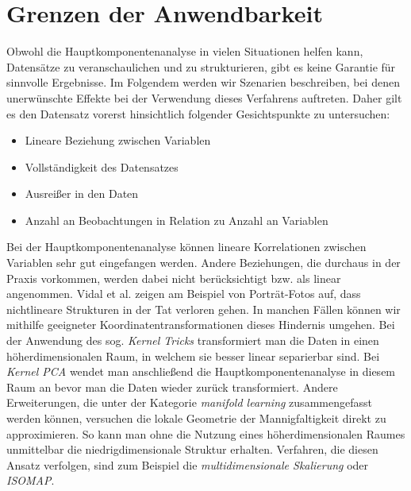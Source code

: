 \section{Grenzen der Anwendbarkeit} \label{theo_results}

Obwohl die Hauptkomponentenanalyse in vielen Situationen helfen kann, Datensätze zu veranschaulichen und zu strukturieren, gibt es keine Garantie für sinnvolle Ergebnisse. Im Folgendem werden wir Szenarien beschreiben, bei denen unerwünschte Effekte bei der Verwendung dieses Verfahrens auftreten. Daher gilt es den Datensatz vorerst hinsichtlich folgender Gesichtspunkte zu untersuchen: 

\begin{itemize}
\item Lineare Beziehung zwischen Variablen
\item Vollständigkeit des Datensatzes
\item Ausreißer in den Daten
\item Anzahl an Beobachtungen in Relation zu Anzahl an Variablen
\end{itemize}

Bei der Hauptkomponentenanalyse können lineare Korrelationen zwischen Variablen sehr gut eingefangen werden. Andere Beziehungen, die durchaus in der Praxis vorkommen, werden dabei nicht berücksichtigt bzw. als linear angenommen. Vidal et al. \cite{vidal} zeigen am Beispiel von Porträt-Fotos auf, dass nichtlineare Strukturen in der Tat verloren gehen. In manchen Fällen können wir mithilfe geeigneter Koordinatentransformationen dieses Hindernis umgehen. Bei der Anwendung des sog. \textit{Kernel Tricks} transformiert man die Daten in einen höherdimensionalen Raum, in welchem sie besser linear separierbar sind. Bei \textit{Kernel PCA} wendet man anschließend die Hauptkomponentenanalyse in diesem Raum an bevor man die Daten wieder zurück transformiert. Andere Erweiterungen, die unter der Kategorie \textit{manifold learning} zusammengefasst werden können, versuchen die lokale Geometrie der Mannigfaltigkeit direkt zu approximieren. So kann man ohne die Nutzung eines höherdimensionalen Raumes unmittelbar die niedrigdimensionale Struktur erhalten. Verfahren, die diesen Ansatz verfolgen, sind zum Beispiel die \textit{multidimensionale Skalierung} oder \textit{ISOMAP}. \cite{lee}

